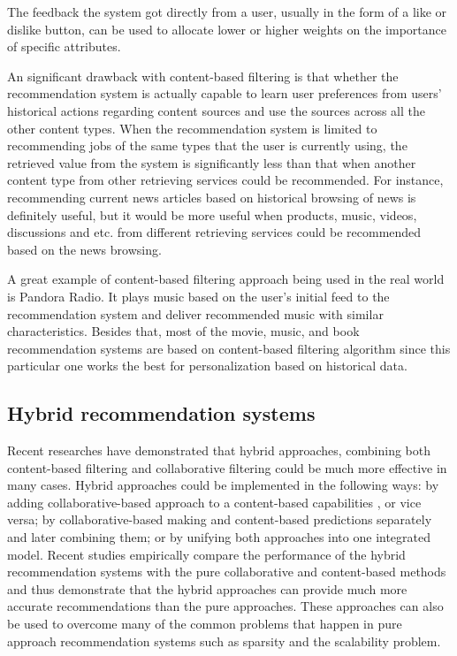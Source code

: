 \documentclass[sigconf]{acmart}
\begin{document}
\par The feedback the system got directly from a user, usually in the form of a like or dislike button, can be used to allocate lower or higher weights on the importance of specific attributes.

\par An significant drawback with content-based filtering is that whether the recommendation system is actually capable to learn user preferences from users' historical actions regarding content sources and use the sources across all the other content types. When the recommendation system is limited to recommending jobs of the same types that the user is currently using, the retrieved value from the system is significantly less than that when another content type from other retrieving services could be recommended. For instance, recommending current news articles based on historical browsing of news is definitely useful, but it would be more useful when products, music, videos, discussions and etc. from different retrieving services could be recommended based on the news browsing.

\par A great example of content-based filtering approach being used in the real world is Pandora Radio. It plays music based on the user's initial feed to the recommendation system and deliver recommended music with similar characteristics. Besides that, most of the movie, music, and book recommendation systems are based on content-based filtering algorithm since this particular one works the best for personalization based on historical data.


\subsection{Hybrid recommendation systems}
Recent researches have demonstrated that hybrid approaches, combining both content-based filtering and collaborative filtering could be much more effective in many cases. Hybrid approaches could be implemented in the following ways: by adding collaborative-based approach to a content-based capabilities , or vice versa; by collaborative-based making and content-based predictions separately and later combining them; or by unifying both approaches into one integrated model. Recent studies empirically compare the performance of the hybrid recommendation systems with the pure collaborative and content-based methods and thus demonstrate that the hybrid approaches can provide much more accurate recommendations than the pure approaches. These approaches can also be used to overcome many of the common problems that happen in pure approach recommendation systems such as sparsity and the scalability problem.
\end{document}
